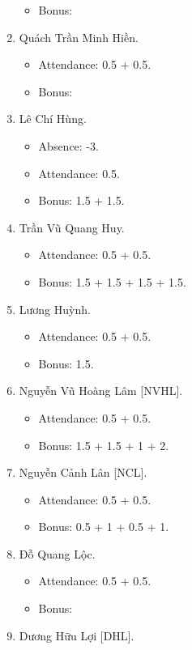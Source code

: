 \documentclass{article}
\begin{document}
\begin{enumerate}
\begin{itemize}
        \item Bonus:
    \end{itemize}
    \item {\sc Quách Trần Minh Hiền.}
    \begin{itemize}
        \item Attendance: 0.5 + 0.5.
        \item Bonus:
    \end{itemize}
    \item {\sc Lê Chí Hùng.}
    \begin{itemize}
        \item Absence: -3.
        \item Attendance: 0.5.
        \item Bonus: 1.5 + 1.5.
    \end{itemize}
    \item {\sc Trần Vũ Quang Huy.}
    \begin{itemize}
        \item Attendance: 0.5 + 0.5.
        \item Bonus: 1.5 + 1.5 + 1.5 + 1.5.
    \end{itemize}
    \item {\sc Lương Huỳnh.}
    \begin{itemize}
        \item Attendance: 0.5 + 0.5.
        \item Bonus: 1.5.
    \end{itemize}
    \item {\sc Nguyễn Vũ Hoàng Lâm [NVHL].}
    \begin{itemize}
        \item Attendance: 0.5 + 0.5.
        \item Bonus: 1.5 + 1.5 + 1 + 2.
    \end{itemize}
    \item {\sc Nguyễn Cảnh Lân [NCL].}
    \begin{itemize}
        \item Attendance: 0.5 + 0.5.
        \item Bonus: 0.5 + 1 + 0.5 + 1.
    \end{itemize}
    \item {\sc Đỗ Quang Lộc.}
    \begin{itemize}
        \item Attendance: 0.5 + 0.5.
        \item Bonus:
    \end{itemize}
    \item {\sc Dương Hữu Lợi [DHL].}

\end{enumerate}
\end{document}
